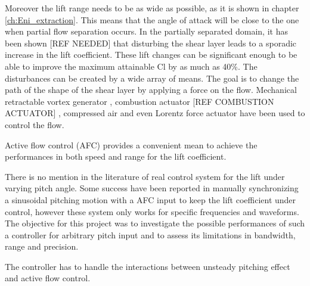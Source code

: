 \par Moreover the lift range needs to be as wide as possible, as it is shown in chapter \ref{ch:Eni_extraction}.
This means that the angle of attack will be close to the one when partial flow separation occurs.
In the partially separated domain, it has been shown [REF NEEDED] that disturbing the shear layer leads to a sporadic increase in the lift coefficient.
These lift changes can be significant enough to be able to improve the maximum attainable Cl by as much as 40\%.
The disturbances can be created by a wide array of means. 
The goal is to change the path of the shape of the shear layer by applying a force on the flow. 
Mechanical retractable vortex generator \cite{Onera_afc}, combustion actuator [REF COMBUSTION ACTUATOR] , compressed air \cite{Williams_afc} and even Lorentz force actuator \cite{Dresden_afc} have been used to control the flow.

\par Active flow control (AFC) provides a convenient mean to achieve the performances in both speed and range for the lift coefficient. 

\par There is no mention in the literature of real control system for the lift under varying pitch angle.
Some success have been reported in manually synchronizing a sinusoidal pitching motion with a AFC input to keep the lift coefficient under control, however these system only works for specific frequencies and waveforms. 
The objective for this project was to investigate the possible performances of such a controller for arbitrary pitch input and to assess its limitations in bandwidth, range and precision.

\par The controller has to handle the interactions between unsteady pitching effect and active flow control.





